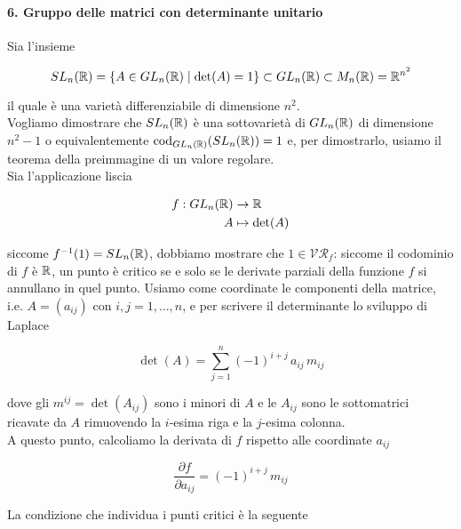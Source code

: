 \paragraph{6. Gruppo delle matrici con determinante unitario}\label{SL-subvar}

Sia l'insieme

\begin{equation}
	SL_{n}(\mathbb{R}) = \{ A \in GL_{n}(\mathbb{R}) \mid \det(A) = 1 \} \subset GL_{n}(\mathbb{R}) \subset M_{n}(\mathbb{R}) = \mathbb{R}^{n^{2}}
\end{equation}

il quale è una varietà differenziabile di dimensione $ n^{2} $.\\
Vogliamo dimostrare che $ SL_{n}(\mathbb{R}) $ è una sottovarietà di $ GL_{n}(\mathbb{R}) $ di dimensione $ n^{2}-1 $ o equivalentemente $ \operatorname{cod}_{GL_{n}(\mathbb{R})}(SL_{n}(\mathbb{R})) = 1 $ e, per dimostrarlo, usiamo il teorema della preimmagine di un valore regolare.\\
Sia l'applicazione liscia

\begin{align}
	\begin{split}
		f : GL_{n}(\mathbb{R}) &\to \mathbb{R}\\
		A &\mapsto \det(A)
	\end{split}
\end{align}

siccome $ f^{-1}(1) = SL_{n}(\mathbb{R}) $, dobbiamo mostrare che $ 1 \in \mathcal{VR}_{f} $: siccome il codominio di $ f $ è $ \mathbb{R} $, un punto è critico se e solo se le derivate parziali della funzione $ f $ si annullano in quel punto. Usiamo come coordinate le componenti della matrice, i.e. $ A = (a_{ij}) $ con $ i,j=1,\dots,n $, e per scrivere il determinante lo sviluppo di Laplace

\begin{equation}
	\det(A) = \sum_{j=1}^{n} (-1)^{i+j} \, a_{ij} \, m_{ij}
\end{equation}

dove gli $ m^{ij} = \det(A_{ij}) $ sono i minori di $ A $ e le $ A_{ij} $ sono le sottomatrici ricavate da $ A $ rimuovendo la $ i $-esima riga e la $ j $-esima colonna.\\
A questo punto, calcoliamo la derivata di $ f $ rispetto alle coordinate $ a_{ij} $

\begin{equation}
	\dfrac{\partial f}{\partial a_{ij}} = (-1)^{i+j} \, m_{ij}
\end{equation}

La condizione che individua i punti critici è la seguente

